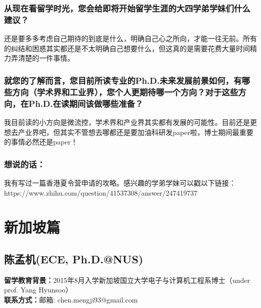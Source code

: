 \documentclass[a4paper,UTF8]{book}
\begin{document}
    \subsubsection*{从现在看留学时光，您会给即将开始留学生涯的大四学弟学妹们什么建议？}
    还是要多多考虑自己期待的到底是什么，明确自己心之所向，才能一往无前。所有的纠结和困惑其实都还是不太明确自己想要什么，但这真的是需要花费大量时间精力弄清楚的一件事情。

    \subsubsection*{就您的了解而言，您目前所读专业的Ph.D.未来发展前景如何，有哪些方向（学术界和工业界），您个人更期待哪一个方向？对于这些方向，在Ph.D.在读期间该做哪些准备？}
    我目前读的小方向是微流控，学术界和产业界其实都有发展的可能性。目前还是更想去产业界吧，但其实不管想去哪都还是要加油科研发paper啦，博士期间最重要的事情必然还是paper！

    \subsubsection{想说的话：}
    我有写过一篇香港夏令营申请的攻略。感兴趣的学弟学妹可以戳以下链接：\\
    https://www.zhihu.com/question/41537308/answer/247419737
    

\clearpage
\section{新加坡篇}

\subsection{陈孟机(ECE, Ph.D.@NUS)}
    \textbf{留学教育背景：}2015年8月入学新加坡国立大学电子与计算机工程系博士（under prof. Yang Hyunsoo）\\
    \textbf{联系方式：}邮箱: chen.mengji93@gmail.com
\end{document}
